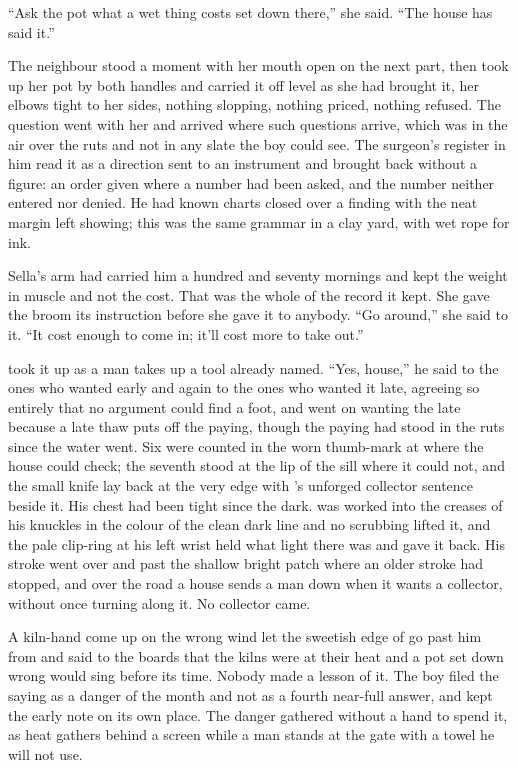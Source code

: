“Ask the pot what a wet thing costs set down there,” she said. “The house has said it.”

The neighbour stood a moment with her mouth open on the next part, then took up her pot by both handles and carried it off level as she had brought it, her elbows tight to her sides, nothing slopping, nothing priced, nothing refused. The question went with her and arrived where such questions arrive, which was in the air over the ruts and not in any slate the boy could see. The surgeon’s register in him read it as a direction sent to an instrument and brought back without a figure: an order given where a number had been asked, and the number neither entered nor denied. He had known charts closed over a finding with the neat margin left showing; this was the same grammar in a clay yard, with wet rope for ink.

Sella’s arm had carried him a hundred and seventy mornings and kept the weight in muscle and not the cost. That was the whole of the record it kept. She gave the broom its instruction before she gave it to anybody. “Go around,” she said to it. “It cost enough to come in; it’ll cost more to take out.”

 took it up as a man takes up a tool already named. “Yes, house,” he said to the ones who wanted  early and again to the ones who wanted it late, agreeing so entirely that no argument could find a foot, and went on wanting the late because a late thaw puts off the paying, though the paying had stood in the ruts since the water went. Six were counted in the worn thumb-mark at  where the house could check; the seventh stood at the lip of the sill where it could not, and the small knife lay back at the very edge with ’s unforged collector sentence beside it. His chest had been tight since the dark.  was worked into the creases of his knuckles in the colour of the clean dark line and no scrubbing lifted it, and the pale clip-ring at his left wrist held what light there was and gave it back. His stroke went over  and past the shallow bright patch where an older stroke had stopped, and over the road a house sends a man down when it wants a collector, without once turning along it. No collector came.

A kiln-hand come up on the wrong wind let the sweetish edge of  go past him from  and said to the boards that the kilns were at their heat and a pot set down wrong would sing before its time. Nobody made a lesson of it. The boy filed the saying as a danger of the month and not as a fourth near-full answer, and kept the early note on its own place. The danger gathered without a hand to spend it, as heat gathers behind a screen while a man stands at the gate with a towel he will not use.

